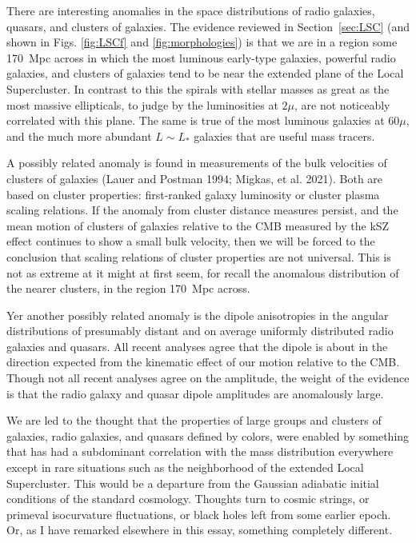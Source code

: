 \documentclass[fleqn,usenatbib]{mnras}
\begin{document}
There are interesting anomalies in the space distributions of radio galaxies, quasars, and clusters of galaxies. The evidence reviewed in Section~\ref{sec:LSC} (and shown in Figs. \ref{fig:LSCf} and  \ref{fig:morphologies}) is that we are in a region some 170~Mpc across in which the most luminous early-type galaxies, powerful radio galaxies, and clusters of galaxies tend to be near the extended plane of the Local Supercluster. In contrast to this the spirals with stellar masses as great as the most massive ellipticals, to judge by the luminosities at $2\mu$, are not noticeably correlated with this plane. The same is true of the most luminous galaxies at $60\mu$, and the much more abundant $L\sim L_\ast$ galaxies that are useful mass tracers.

A possibly related anomaly is found in measurements of the bulk velocities of clusters of galaxies (Lauer  and Postman 1994; Migkas, et al. 2021). Both are based on cluster properties: first-ranked galaxy luminosity or cluster plasma scaling relations. If the anomaly from cluster distance measures persist, and the mean motion of clusters of galaxies relative to the CMB measured by the kSZ effect continues to show a small bulk velocity, then we will be forced to the conclusion that scaling relations of cluster properties are not universal. This is not as extreme at it might at first seem, for recall the anomalous distribution of the nearer clusters, in the region 170~Mpc across. 

Yer another possibly related anomaly is the dipole anisotropies in the angular distributions of presumably distant and on average uniformly distributed radio galaxies and quasars. All recent analyses agree that the dipole is about in the direction expected from the kinematic effect of our motion relative to the CMB. Though not all recent analyses agree on the amplitude, the weight of the evidence is that the radio galaxy and quasar dipole amplitudes are anomalously large. 

We are led to the thought that the properties of large groups and clusters of galaxies, radio galaxies, and quasars defined by colors, were enabled by something that has had a subdominant correlation with the mass distribution  everywhere except in rare situations such as the neighborhood of the extended Local Supercluster. This would be a departure from the Gaussian adiabatic initial conditions of the standard cosmology. Thoughts turn to cosmic strings, or primeval isocurvature fluctuations, or black holes left from some earlier epoch. Or, as I have remarked elsewhere in this essay, something completely different. 
\end{document}
